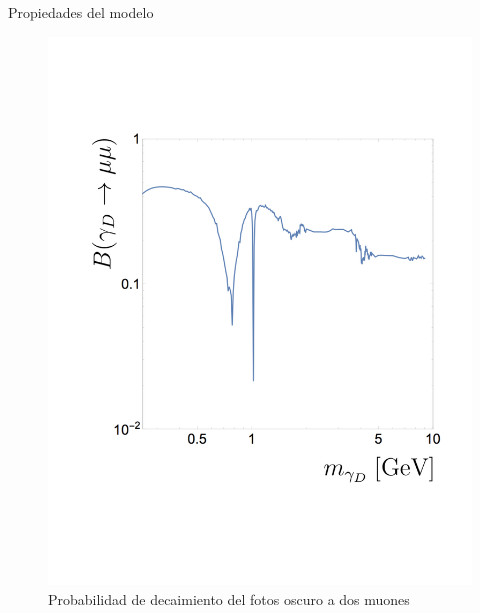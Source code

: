 \begin{frame}{Propiedades del modelo}


    \begin{figure}[ht]
        \begin{minipage}[b]{0.45\linewidth}
            \centering
            \includegraphics[width=\textwidth]{Imag/figures_intro_GammaD_BR_to_2mu_9GeVLog_updateTitles.pdf}
            \caption{Probabilidad de decaimiento del fotos oscuro a dos muones}
            \label{fig:a}
        \end{minipage}
        \hspace{0.5cm}
        \begin{minipage}[b]{0.45\linewidth}
            \centering

\end{minipage}
\end{figure}
\end{frame}
